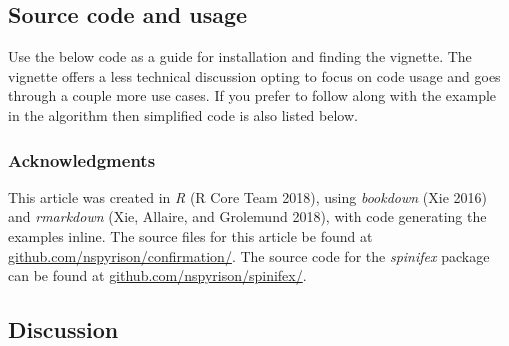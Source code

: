 \hypertarget{sec:usage}{%
\subsection{Source code and usage}\label{sec:usage}}

Use the below code as a guide for installation and finding the vignette. The vignette offers a less technical discussion opting to focus on code usage and goes through a couple more use cases. If you prefer to follow along with the example in the algorithm then simplified code is also listed below.

\begin{Schunk}
\end{Schunk}

\hypertarget{acknowledgments}{%
\subsubsection{Acknowledgments}\label{acknowledgments}}

This article was created in \emph{R} (R Core Team 2018), using \emph{bookdown} (Xie 2016) and \emph{rmarkdown} (Xie, Allaire, and Grolemund 2018), with code generating the examples inline. The source files for this article be found at \href{https://github.com/nspyrison/confirmation/}{github.com/nspyrison/confirmation/}.
The source code for the \emph{spinifex} package can be found at \href{https://github.com/nspyrison/spinifex/}{github.com/nspyrison/spinifex/}.

\hypertarget{sec:discussion}{%
\subsection{Discussion}\label{sec:discussion}}


